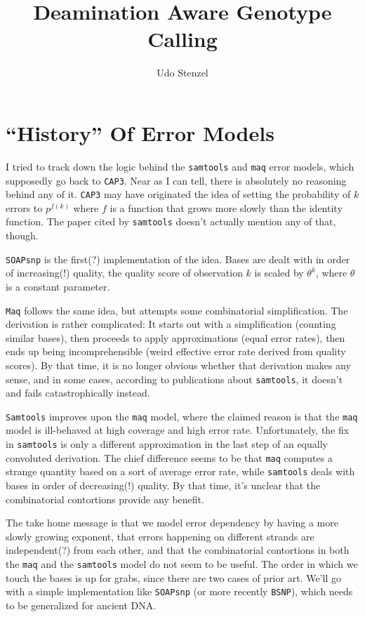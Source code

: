 \documentclass{article}
\title{Deamination Aware Genotype Calling}
\author{Udo Stenzel}
\begin{document}
\maketitle

\section{``History'' Of Error Models}

I tried to track down the logic behind the \texttt{samtools} and
\texttt{maq} error models, which supposedly go back to \texttt{CAP3}.
Near as I can tell, there is absolutely no reasoning behind any of it.
\texttt{CAP3} may have originated the idea of setting the probability of
$k$ errors to $p^{f(k)}$ where $f$ is a function that grows more slowly
than the identity function.  The paper cited by \texttt{samtools}
doesn't actually mention any of that, though.

\texttt{SOAPsnp}\cite{soapsnp} is the first(?) implementation of the idea.  Bases are
dealt with in order of increasing(!) quality, the quality score of
observation $k$ is scaled by $\theta^k$, where $\theta$ is a constant
parameter.

\texttt{Maq}\cite{maq} follows the same idea, but attempts some combinatorial
simplification.  The derivation is rather complicated:  It starts out
with a simplification (counting similar bases), then proceeds to apply
approximations (equal error rates), then ends up being incomprehensible
(weird effective error rate derived from quality scores).  By that time,
it is no longer obvious whether that derivation makes any sense, and in
some cases, according to publications about
\texttt{samtools}\cite{samtools}, it
doesn't and fails catastrophically instead.

\texttt{Samtools}\cite{samtools} improves upon the \texttt{maq} model, where the
claimed reason is that the \texttt{maq} model is ill-behaved at high
coverage and high error rate.  Unfortunately, the fix in
\texttt{samtools} is only a different approximation in the last step of
an equally convoluted derivation.  The chief difference seems to be that
\texttt{maq} computes a strange quantity based on a sort of average
error rate, while \texttt{samtools} deals with bases in order of
decreasing(!) quality.  By that time, it's unclear that the
combinatorial contortions provide any benefit.

The take home message is that we model error dependency by having a more
slowly growing exponent, that errors happening on different strands are
independent(?) from each other, and that the combinatorial
contortions in both the \texttt{maq} and the \texttt{samtools} model do
not seem to be useful.  The order in which we touch the bases is up for
grabs, since there are two cases of prior art.  We'll go with a simple
implementation like \texttt{SOAPsnp} (or more recently
\texttt{BSNP}\cite{bsnp}), which needs to be generalized for ancient
DNA.
\end{document}
